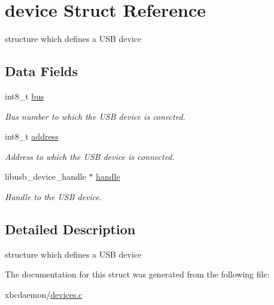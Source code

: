 \hypertarget{structdevice}{\section{device Struct Reference}
\label{structdevice}
}


structure which defines a U\-S\-B device  


\subsection*{Data Fields}
\begin{DoxyCompactItemize}
\item 
\hypertarget{structdevice_abb32649ab67e086f7c548e3e8b4b66f9}{int8\-\_\-t \hyperlink{structdevice_abb32649ab67e086f7c548e3e8b4b66f9}{bus}}\label{structdevice_abb32649ab67e086f7c548e3e8b4b66f9}

\begin{DoxyCompactList}\small\item\em Bus number to which the U\-S\-B device is conected. \end{DoxyCompactList}\item 
\hypertarget{structdevice_a97b18776f162b8776de42e4eea5bfbfb}{int8\-\_\-t \hyperlink{structdevice_a97b18776f162b8776de42e4eea5bfbfb}{address}}\label{structdevice_a97b18776f162b8776de42e4eea5bfbfb}

\begin{DoxyCompactList}\small\item\em Address to which the U\-S\-B device is connected. \end{DoxyCompactList}\item 
\hypertarget{structdevice_a96cd449c4b349daaf3ec8700056aa462}{libusb\-\_\-device\-\_\-handle $\ast$ \hyperlink{structdevice_a96cd449c4b349daaf3ec8700056aa462}{handle}}\label{structdevice_a96cd449c4b349daaf3ec8700056aa462}

\begin{DoxyCompactList}\small\item\em Handle to the U\-S\-B device. \end{DoxyCompactList}\end{DoxyCompactItemize}


\subsection{Detailed Description}
structure which defines a U\-S\-B device 

The documentation for this struct was generated from the following file\-:\begin{DoxyCompactItemize}
\item 
xbcdaemon/\hyperlink{devices_8c}{devices.\-c}\end{DoxyCompactItemize}
